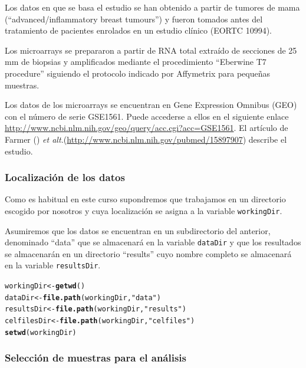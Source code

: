 \documentclass[a4paper]{article}\usepackage[]{graphicx}\usepackage[]{color}
\makeatletter
\newcommand{\hlstr}[1]{\textcolor[rgb]{0.192,0.494,0.8}{#1}}%
\newcommand{\hlstd}[1]{\textcolor[rgb]{0.345,0.345,0.345}{#1}}%
\newcommand{\hlkwb}[1]{\textcolor[rgb]{0.69,0.353,0.396}{#1}}%
\newcommand{\hlkwd}[1]{\textcolor[rgb]{0.737,0.353,0.396}{\textbf{#1}}}%
\newenvironment{kframe}{%
 \def\at@end@of@kframe{}%
 \ifinner\ifhmode%
  \def\at@end@of@kframe{\end{minipage}}%
  \begin{minipage}{\columnwidth}%
 \fi\fi%
 \def\FrameCommand##1{\hskip\@totalleftmargin \hskip-\fboxsep
 \colorbox{shadecolor}{##1}\hskip-\fboxsep
     \hskip-\linewidth \hskip-\@totalleftmargin \hskip\columnwidth}%
 \MakeFramed {\advance\hsize-\width
   \@totalleftmargin\z@ \linewidth\hsize
   \@setminipage}}%
 {\par\unskip\endMakeFramed%
 \at@end@of@kframe}
\newenvironment{knitrout}{}{} %
\newcommand{\etal}{{\it et alt.}}
\makeatother
\begin{document}
Los datos en que se basa el estudio se han obtenido a partir de tumores de mama (``advanced/inflammatory breast tumours'') y fueron tomados antes del tratamiento de pacientes enrolados en un estudio clínico (EORTC 10994). 

Los microarrays se prepararon a partir de RNA total extraído de secciones de 25 mm de biopsias y amplificados mediante el procedimiento ``Eberwine T7 procedure'' siguiendo el protocolo indicado por Affymetrix para pequeñas muestras.

Los datos de los microarrays se encuentran en Gene Expression Omnibus (GEO) con el número de serie GSE1561. Puede accederse a ellos  en el siguiente enlace \url{http://www.ncbi.nlm.nih.gov/geo/query/acc.cgi?acc=GSE1561}. El artículo de Farmer (\cite{Farmer2005}) \etal (\url{http://www.ncbi.nlm.nih.gov/pubmed/15897907}) describe el estudio.

\subsubsection{Localización de los datos}

Como es habitual en este curso supondremos que trabajamos en un directorio 
escogido por nosotros y cuya localización se asigna a la variable \texttt{workingDir}.

Asumiremos que los datos se encuentran en un subdirectorio del anterior, denominado ``data'' que se almacenará en la variable \texttt{dataDir} y que los resultados se almacenarán en un directorio ``results'' cuyo nombre completo se almacenará en la variable  \texttt{resultsDir}.

\begin{knitrout}
\color{fgcolor}\begin{kframe}
\begin{alltt}
\hlstd{workingDir} \hlkwb{<-}\hlkwd{getwd}\hlstd{()}
\hlstd{dataDir} \hlkwb{<-}\hlkwd{file.path}\hlstd{(workingDir,} \hlstr{"data"}\hlstd{)}
\hlstd{resultsDir} \hlkwb{<-} \hlkwd{file.path}\hlstd{(workingDir,}\hlstr{"results"}\hlstd{)}
\hlstd{celfilesDir} \hlkwb{<-} \hlkwd{file.path}\hlstd{(workingDir,}\hlstr{"celfiles"}\hlstd{)}
\hlkwd{setwd}\hlstd{(workingDir)}
\end{alltt}
\end{kframe}
\end{knitrout}

\subsubsection{Selección de muestras para el análisis}
\end{document}
